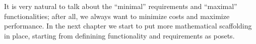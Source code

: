 It is very natural to talk about the ``minimal'' requirements and ``maximal'' functionalities; after all, we always want to minimize costs and maximize performance.
In the next chapter we start to put more mathematical scaffolding in place, starting from definining functionality and requirements as posets.


